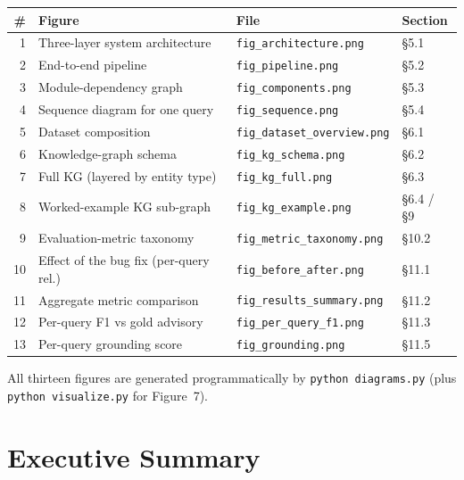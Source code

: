 \documentclass[11pt,a4paper]{article}
\begin{document}
\begin{center}
\small
\begin{tabular}{@{}rlll@{}}
\toprule
\# & Figure & File & Section\\
\midrule
1  & Three-layer system architecture           & \texttt{fig\_architecture.png}      & \S5.1 \\
2  & End-to-end pipeline                       & \texttt{fig\_pipeline.png}          & \S5.2 \\
3  & Module-dependency graph                   & \texttt{fig\_components.png}        & \S5.3 \\
4  & Sequence diagram for one query            & \texttt{fig\_sequence.png}          & \S5.4 \\
5  & Dataset composition                       & \texttt{fig\_dataset\_overview.png} & \S6.1 \\
6  & Knowledge-graph schema                    & \texttt{fig\_kg\_schema.png}        & \S6.2 \\
7  & Full KG (layered by entity type)          & \texttt{fig\_kg\_full.png}          & \S6.3 \\
8  & Worked-example KG sub-graph               & \texttt{fig\_kg\_example.png}       & \S6.4 / \S9 \\
9  & Evaluation-metric taxonomy                & \texttt{fig\_metric\_taxonomy.png}  & \S10.2 \\
10 & Effect of the bug fix (per-query rel.)    & \texttt{fig\_before\_after.png}     & \S11.1 \\
11 & Aggregate metric comparison               & \texttt{fig\_results\_summary.png}  & \S11.2 \\
12 & Per-query F1 vs gold advisory             & \texttt{fig\_per\_query\_f1.png}    & \S11.3 \\
13 & Per-query grounding score                 & \texttt{fig\_grounding.png}         & \S11.5 \\
\bottomrule
\end{tabular}
\end{center}

\noindent All thirteen figures are generated programmatically by
\texttt{python diagrams.py} (plus \texttt{python visualize.py} for
Figure~7).

\section{Executive Summary}\label{sec:exec-summary}
\end{document}
